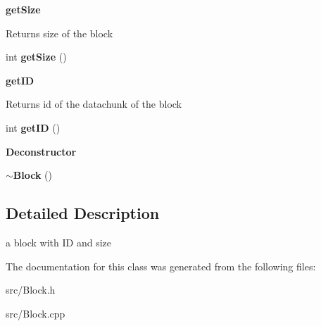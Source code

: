 \begin{Indent}{\bf get\+Size}\par
{\em \begin{DoxyReturn}{Returns}
size of the block 
\end{DoxyReturn}
}\begin{DoxyCompactItemize}
\item 
\hypertarget{class_block_a5da1ca635535bebecb9bbb075453bda1}{}int {\bfseries get\+Size} ()\label{class_block_a5da1ca635535bebecb9bbb075453bda1}

\end{DoxyCompactItemize}
\end{Indent}
\begin{Indent}{\bf get\+I\+D}\par
{\em \begin{DoxyReturn}{Returns}
id of the datachunk of the block 
\end{DoxyReturn}
}\begin{DoxyCompactItemize}
\item 
\hypertarget{class_block_a2ef86a85c550acbfaaa39997079ffa1f}{}int {\bfseries get\+I\+D} ()\label{class_block_a2ef86a85c550acbfaaa39997079ffa1f}

\end{DoxyCompactItemize}
\end{Indent}
\begin{Indent}{\bf Deconstructor}\par
\begin{DoxyCompactItemize}
\item 
\hypertarget{class_block_a19d1bd0e1cef6a865ed2745a2e648405}{}{\bfseries $\sim$\+Block} ()\label{class_block_a19d1bd0e1cef6a865ed2745a2e648405}

\end{DoxyCompactItemize}
\end{Indent}


\subsection{Detailed Description}
a block with I\+D and size 

The documentation for this class was generated from the following files\+:\begin{DoxyCompactItemize}
\item 
src/Block.\+h\item 
src/Block.\+cpp\end{DoxyCompactItemize}

